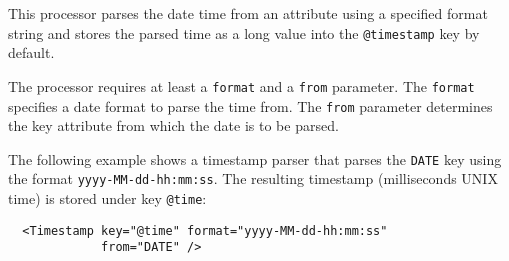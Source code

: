 
This processor parses the date time from an attribute using a specified
format string and stores the parsed time as a long value into the
\texttt{@timestamp} key by default.

The processor requires at least a \texttt{format} and a \texttt{from}
parameter. The \texttt{format} specifies a date format to parse the time
from. The \texttt{from} parameter determines the key attribute from
which the date is to be parsed.

The following example shows a timestamp parser that parses the
\texttt{DATE} key using the format \texttt{yyyy-MM-dd-hh:mm:ss}. The
resulting timestamp (milliseconds UNIX time) is stored under key
\texttt{@time}:

\begin{verbatim}
  <Timestamp key="@time" format="yyyy-MM-dd-hh:mm:ss"
             from="DATE" />
\end{verbatim}


\begin{table}[h]
\end{table}
